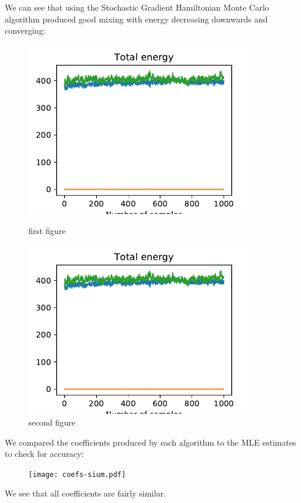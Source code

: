 We can see that using the Stochastic Gradient Hamiltonian Monte Carlo algorithm produced good mixing with energy decreasing downwards and converging:

\begin{figure}[H]
	\centering
	\begin{minipage}{0.45\textwidth}
		\centering
		\includegraphics[width=0.9\textwidth]{sghmc-energy-sim.pdf} %
		\caption{first figure}
	\end{minipage}\hfill
	\begin{minipage}{0.45\textwidth}
		\centering
		\includegraphics[width=0.9\textwidth]{sghmc-energy-sim.pdf} %
		\caption{second figure}
	\end{minipage}
\end{figure}

We compared the coefficients produced by each algorithm to the MLE estimates to check for accuracy:

\begin{figure}[H]
	\centering
	\texttt{[image: coefs-sium.pdf]}
\end{figure}

We see that all coefficients are fairly similar.